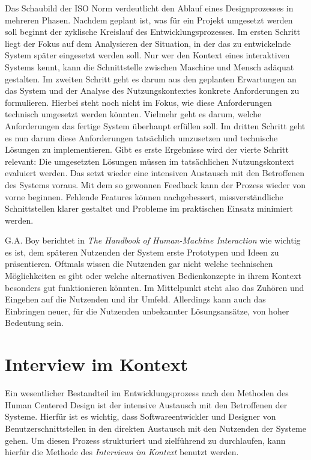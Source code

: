 Das Schaubild der ISO Norm verdeutlicht den Ablauf eines Designprozesses in
mehreren Phasen. Nachdem geplant ist, was für ein Projekt umgesetzt werden soll
beginnt der zyklische Kreislauf des Entwicklungsprozesses. Im ersten Schritt
liegt der Fokus auf dem Analysieren der Situation, in der das zu entwickelnde
System später eingesetzt werden soll. Nur wer den Kontext eines interaktiven
Systems kennt, kann die Schnittstelle zwischen Maschine und Mensch adäquat
gestalten. Im zweiten Schritt geht es darum aus den geplanten Erwartungen an
das System und der Analyse des Nutzungskontextes konkrete Anforderungen zu
formulieren. Hierbei steht noch nicht im Fokus, wie diese Anforderungen
technisch umgesetzt werden könnten. Vielmehr geht es darum, welche
Anforderungen das fertige System überhaupt erfüllen soll. Im dritten Schritt
geht es nun darum diese Anforderungen tatsächlich umzusetzen und technische
Lösungen zu implementieren. Gibt es erste Ergebnisse wird der vierte Schritt
relevant: Die umgesetzten Lösungen müssen im tatsächlichen Nutzungskontext
evaluiert werden. Das setzt wieder eine intensiven Austausch mit den
Betroffenen des Systems voraus. Mit dem so gewonnen Feedback kann der Prozess
wieder von vorne beginnen. Fehlende Features können nachgebessert,
missverständliche Schnittstellen klarer gestaltet und Probleme im praktischen
Einsatz minimiert werden.\cite{ISO9241}

G.A. Boy berichtet in \textit{The Handbook of Human-Machine Interaction} wie
wichtig es ist, dem späteren Nutzenden der System erste Prototypen und Ideen zu
präsentieren. Oftmals wissen die Nutzenden gar nicht welche technischen
Möglichkeiten es gibt oder welche alternativen Bedienkonzepte in ihrem Kontext
besonders gut funktionieren könnten. Im Mittelpunkt steht also das Zuhören und Eingehen auf die
Nutzenden und ihr Umfeld. Allerdings kann auch das Einbringen neuer, für die Nutzenden
unbekannter Lösungsansätze, von hoher Bedeutung sein.\cite{HMI-HCD}

\section{Interview im Kontext}

Ein wesentlicher Bestandteil im Entwicklungsprozess nach den Methoden des Human
Centered Design ist der intensive Austausch mit den Betroffenen der Systeme.
Hierfür ist es wichtig, dass Softwareentwickler und Designer von
Benutzerschnittstellen in den direkten Austausch mit den Nutzenden der Systeme
gehen. Um diesen Prozess strukturiert und zielführend zu durchlaufen, kann
hierfür die Methode des \textit{Interviews im Kontext} benutzt werden.

